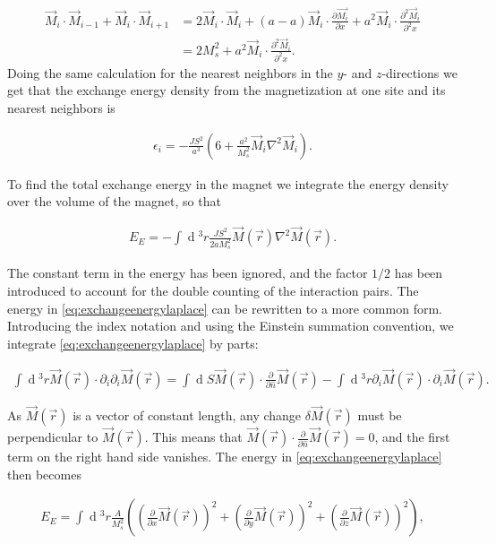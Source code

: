 \documentclass[1p]{elsarticle}		%
\renewcommand{\d}[1]{\ensuremath{\operatorname{d}\!{#1}}}
\numberwithin{equation}{section}
\begin{document}
\begin{align*}
\vec{M}_i\cdot\vec{M}_{i-1}+\vec{M}_i\cdot\vec{M}_{i+1} &= 2\vec{M}_i\cdot\vec{M}_i + (a - a) \vec{M}_i\cdot\frac{\partial \vec{M_i}}{\partial x} + a^2\vec{M}_i\cdot\frac{\partial^2 \vec{M}_i}{\partial^2 x} \\
&= 2M_s^2 + a^2\vec{M}_i\cdot\frac{\partial^2 \vec{M}_i}{\partial^2 x}.
\end{align*}
Doing the same calculation for the nearest neighbors in the $y$- and $z$-directions we get that the exchange energy density from the magnetization at one site and its nearest neighbors is

\begin{align}
\epsilon_i = -\frac{JS^2}{a^3}(6+\frac{a^2}{M_s^2}\vec{M}_i\nabla^2\vec{M}_i).
\end{align}

To find the total exchange energy in the magnet we integrate the energy density over the volume of the magnet, so that

\begin{align}
\label{eq:exchangeenergylaplace}
E_E = -\int \d {^3}r \frac{JS^2}{2aM_s^2} \vec{M}(\vec{r})\nabla^2\vec{M}(\vec{r}).
\end{align}

The constant term in the energy has been ignored, and the factor $1/2$ has been introduced to account for the double counting of the interaction pairs. The energy in \eqref{eq:exchangeenergylaplace} can be rewritten to a more common form. Introducing the index notation and using the Einstein summation convention, we integrate \eqref{eq:exchangeenergylaplace} by parts: 

\begin{align}
\label{eq:exchangeenergyDiv2}
\int \d {^3}r \vec{M}(\vec{r})\cdot\partial_i \partial_i \vec{M}(\vec{r}) = \int \d S \vec{M}(\vec{r})\cdot \frac{\partial}{\partial \hat{n}}\vec{M}(\vec{r}) - \int \d {^3}r \partial_i  \vec{M}(\vec{r})\cdot\partial_i \vec{M}(\vec{r}).
\end{align}

As $\vec{M}(\vec{r})$ is a vector of constant length, any change $\delta \vec{M}(\vec{r})$ must be perpendicular to $\vec{M}(\vec{r})$. This means that $\vec{M}(\vec{r})\cdot \frac{\partial}{\partial \hat{n}}\vec{M}(\vec{r}) = 0$, and the first term on the right hand side vanishes. The energy in \eqref{eq:exchangeenergylaplace} then becomes

\begin{align}
\label{eq:exchangeenergy}
E_E = \int \d {^3}r \frac{A}{M_s^2} ((\frac{\partial}{\partial x}\vec{M}(\vec{r}))^2+(\frac{\partial}{\partial y}\vec{M}(\vec{r}))^2+(\frac{\partial}{\partial z}\vec{M}(\vec{r}))^2),
\end{align}
\end{document}
